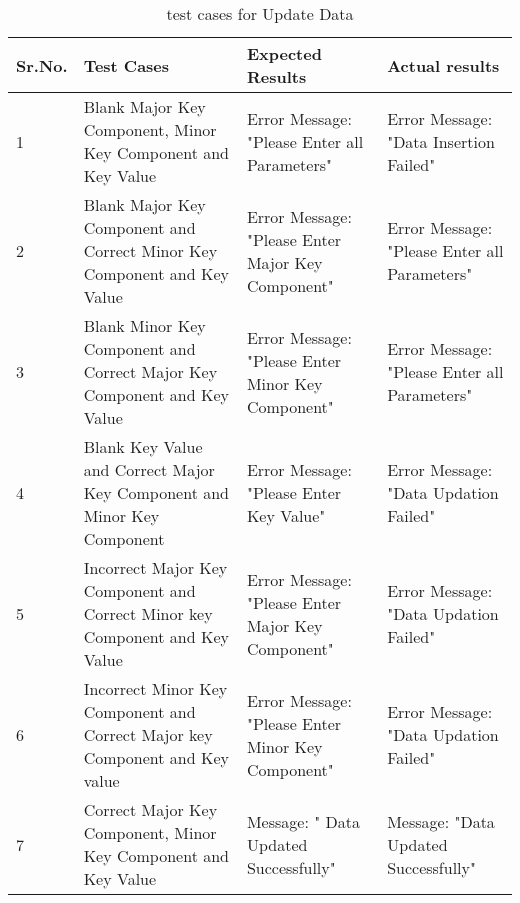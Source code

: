 \begin{table}[h]
\begin{flushleft}
\caption{test cases for Update Data}\label{test cases for Update Data}
\begin{tabular}{|p{1cm}|p{4cm}|p{4cm}|p{5cm}|} \hline
Sr.No. & Test Cases & Expected Results & Actual results \\ \hline
1 & Blank Major Key Component, Minor Key Component and Key Value & Error Message: "Please Enter all Parameters" & Error Message: "Data Insertion Failed"\\	 \hline
2 & Blank Major Key Component and Correct Minor Key Component and Key Value & Error Message: "Please Enter Major Key Component" & Error Message: "Please Enter all Parameters"\\	 \hline
3 & Blank Minor Key Component and Correct Major Key Component and Key Value & Error Message: "Please Enter Minor Key Component" & Error Message: "Please Enter all Parameters"\\	 \hline
4 & Blank Key Value and Correct Major Key Component and Minor Key Component & Error Message: "Please Enter Key Value" & Error Message: "Data Updation Failed"\\	 \hline
5 & Incorrect Major Key Component and Correct Minor key Component and Key Value & Error Message: "Please Enter Major Key Component" & Error Message: "Data Updation Failed"\\	 \hline
6 & Incorrect Minor Key Component and Correct Major key Component and Key value & Error Message: "Please Enter Minor Key Component" & Error Message: "Data Updation Failed"\\	 \hline
7 & Correct Major Key Component, Minor Key Component and Key Value & Message: " Data Updated Successfully" &Message: "Data Updated Successfully" \\	 \hline
\end{tabular}
\end{flushleft}
\end{table}

